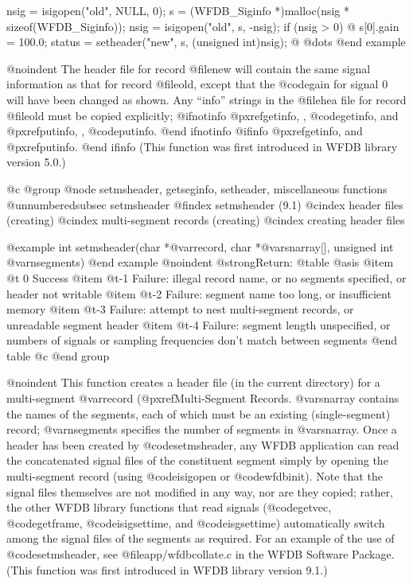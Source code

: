 {{{{{{{{nsig = isigopen("old", NULL, 0);
s = (WFDB_Siginfo *)malloc(nsig * sizeof(WFDB_Siginfo));
nsig = isigopen("old", s, -nsig);
if (nsig > 0) @{
    s[0].gain = 100.0;
    status = setheader("new", s, (unsigned int)nsig);
@}
@dots{}
@end example

@noindent
The header file for record @file{new} will contain the same signal
information as that for record @file{old}, except that the @code{gain}
for signal 0 will have been changed as shown.  Any ``info'' strings in
the @file{hea} file for record @file{old} must be copied explicitly;
@ifnotinfo
@pxref{getinfo, , @code{getinfo}}, and @pxref{putinfo, , @code{putinfo}}.
@end ifnotinfo
@ifinfo
@pxref{getinfo}, and @pxref{putinfo}.
@end ifinfo
(This function was first
introduced in WFDB library version 5.0.)

@c @group
@node     setmsheader, getseginfo, setheader, miscellaneous functions
@unnumberedsubsec setmsheader
@findex setmsheader (9.1)
@cindex header files (creating)
@cindex multi-segment records (creating)
@cindex creating header files

@example
int setmsheader(char *@var{record}, char *@var{snarray}[], unsigned int @var{nsegments})
@end example
@noindent
@strong{Return:}
@table @asis
@item @t{ 0}
Success
@item @t{-1}
Failure: illegal record name, or no segments specified, or header not writable
@item @t{-2}
Failure: segment name too long, or insufficient memory
@item @t{-3}
Failure: attempt to nest multi-segment records, or unreadable segment
header
@item @t{-4}
Failure: segment length unspecified, or numbers of signals or sampling
frequencies don't match between segments
@end table
@c @end group

@noindent
This function creates a header file (in the current directory) for a
multi-segment @var{record} (@pxref{Multi-Segment Records}.  @var{snarray}
contains the names of the segments, each of which must be an existing
(single-segment) record; @var{nsegments} specifies the number of segments in
@var{snarray}.  Once a header has been created by @code{setmsheader}, any WFDB
application can read the concatenated signal files of the constituent segment
simply by opening the multi-segment record (using @code{isigopen} or
@code{wfdbinit}).  Note that the signal files themselves are not modified in
any way, nor are they copied; rather, the other WFDB library functions that
read signals (@code{getvec}, @code{getframe}, @code{isigsettime}, and
@code{isgsettime}) automatically switch among the signal files of the segments
as required.  For an example of the use of @code{setmsheader}, see
@file{app/wfdbcollate.c} in the WFDB Software Package.  (This function was
first introduced in WFDB library version 9.1.)

}}}}}}}}
